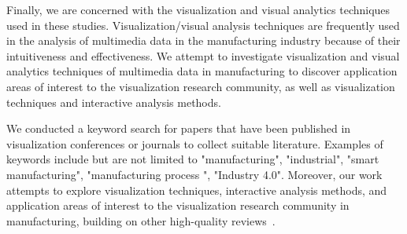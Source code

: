 \documentclass[a4paper,fleqn]{cas-dc}
\begin{document}
Finally, we are concerned with the visualization and visual analytics techniques used in these studies.
Visualization/visual analysis techniques are frequently used in the analysis of multimedia data in the manufacturing industry because of their intuitiveness and effectiveness.
We attempt to investigate visualization and visual analytics techniques of multimedia data in manufacturing to discover application areas of interest to the visualization research community, as well as visualization techniques and interactive analysis methods.

We conducted a keyword search for papers that have been published in visualization conferences or journals to collect suitable literature.
Examples of keywords include but are not limited to "manufacturing", "industrial", "smart manufacturing", "manufacturing process ", "Industry 4.0".
Moreover, our work attempts to explore visualization techniques, interactive analysis methods, and application areas of interest to the visualization research community in manufacturing, building on other high-quality reviews~\cite{shi2020visual, wang2018visualization}.

\end{document}
